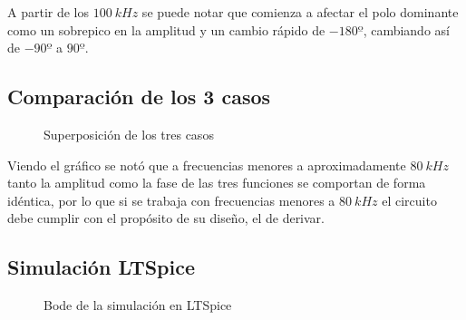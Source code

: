 A partir de los $100 \ kHz$ se puede notar que comienza a afectar el polo dominante como un sobrepico en la amplitud y un cambio rápido de $-180º$, cambiando así de $-90º$ a $90º$.

\subsection{Comparación de los 3 casos}	\label{sub:comparaciondelos3casos}
\begin{figure}[H]
	\begin{center}
		\caption{Superposición de los tres casos}
		\label{fig:comparacion3avolderivador}
	\end{center}
\end{figure}

Viendo el gráfico se notó que a frecuencias menores a aproximadamente $80 \ kHz$ tanto la amplitud como la fase de las tres funciones se comportan de forma idéntica, por lo que si se trabaja con frecuencias menores a $80 \ kHz$ el circuito debe cumplir con el propósito de su diseño, el de derivar.

\subsection{Simulación LTSpice}
\begin{figure}[H]
	\begin{center}
		\caption{Bode de la simulación en LTSpice}
		\label{fig:simulacionderivador}
	\end{center}
\end{figure}

